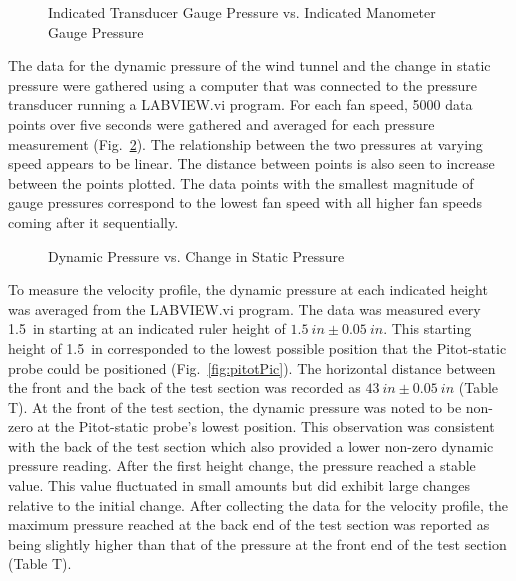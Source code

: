 \documentclass[journal,letterpaper]{IEEEtran}
\begin{document}
\begin{figure}[H]
    \centering
    \caption{Indicated Transducer Gauge Pressure vs. Indicated Manometer Gauge Pressure}
    \label{fig:calibration}
\end{figure}

The data for the dynamic pressure of the wind tunnel and the change in static pressure were gathered using a computer that was connected to the pressure transducer running a LABVIEW.vi program.
For each fan speed, 5000 data points over five seconds were gathered and averaged for each pressure measurement (Fig.~\ref{fig:data}).
The relationship between the two pressures at varying speed appears to be linear.
The distance between points is also seen to increase between the points plotted.
The data points with the smallest magnitude of gauge pressures correspond to the lowest fan speed with all higher fan speeds coming after it sequentially.

\begin{figure}[H]
    \centering
    \caption{Dynamic Pressure vs. Change in Static Pressure}
    \label{fig:data}
\end{figure}

To measure the velocity profile, the dynamic pressure at each indicated height was averaged from the LABVIEW.vi program.
The data was measured every \qty{1.5}{in} starting at an indicated ruler height of $\qty{1.5}{in} \pm \qty{0.05}{in}$.
This starting height of \qty{1.5}{in} corresponded to the lowest possible position that the Pitot-static probe could be positioned (Fig.~\ref{fig:pitotPic}).
The horizontal distance between the front and the back of the test section was recorded as $\qty{43}{in} \pm \qty{0.05}{in}$ (Table T).
At the front of the test section, the dynamic pressure was noted to be non-zero at the Pitot-static probe's lowest position.
This observation was consistent with the back of the test section which also provided a lower non-zero dynamic pressure reading.
After the first height change, the pressure reached a stable value.
This value fluctuated in small amounts but did exhibit large changes relative to the initial change.
After collecting the data for the velocity profile, the maximum pressure reached at the back end of the test section was reported as being slightly higher than that of the pressure at the front end of the test section (Table T).
\end{document}
